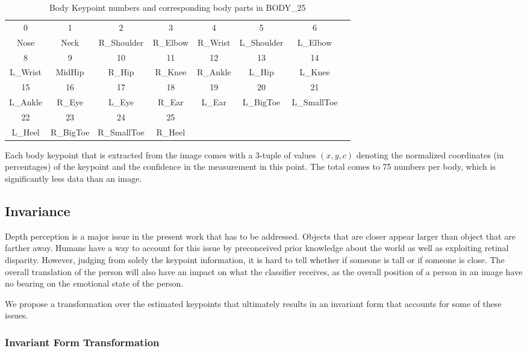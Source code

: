 \documentclass{article}
\begin{document}
\begin{table}[h]
	\caption{Body Keypoint numbers and corresponding body parts in BODY\_25}
	\centering
	\begin{tabular}{cccccccc}
	\toprule
	0 & 1 & 2 & 3 & 4 & 5 & 6 \\
	Nose & Neck & R\_Shoulder & R\_Elbow & R\_Wrist & L\_Shoulder & L\_Elbow\\	
	\midrule
	8 & 9 & 10 & 11 & 12 & 13 & 14\\
	L\_Wrist & MidHip & R\_Hip & R\_Knee & R\_Ankle & L\_Hip & L\_Knee\\
	\midrule
	15 & 16 & 17 & 18 & 19 & 20 & 21\\
	L\_Ankle & R\_Eye & L\_Eye & R\_Ear & L\_Ear & L\_BigToe & L\_SmallToe\\
	\midrule
	22 & 23 & 24 & 25\\
	L\_Heel &R\_BigToe & R\_SmallToe & R\_Heel\\
	\midrule
	\end{tabular}
\end{table}

Each body keypoint that is extracted from the image comes with a 3-tuple of values $(x,y,c)$ denoting the normalized coordinates (in percentages) of the keypoint and the confidence in the measurement in this point. The total comes to 75 numbers per body, which is significantly less data than an image.

\subsection{Invariance}
Depth perception is a major issue in the present work that has to be addressed. Objects that are closer appear larger than object that are farther away. Humans have a way to account for this issue by preconceived prior knowledge about the world as well as exploiting retinal disparity. However, judging from solely the keypoint information, it is hard to tell whether if someone is tall or if someone is close. The overall translation of the person will also have an impact on what the classifier receives, as the overall position of a person in an image have no bearing on the emotional state of the person.

We propose a transformation over the estimated keypoints that ultimately results in an invariant form that accounts for some of these issues.

\subsubsection{Invariant Form Transformation}
\end{document}
